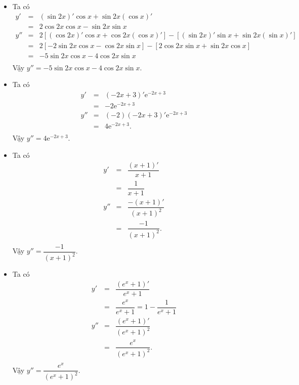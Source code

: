 \begin{bt}
{\begin{itemize}
			\item[c)]  Ta có 
			\allowdisplaybreaks
			\begin{eqnarray*}
				y'&=&\left( \sin 2 x \right)'\cos x +\sin 2 x \left( \cos x\right)' \\
				&=&2 \cos 2x \cos x- \sin 2x \sin x\\
				y''&=&2\left[\left(  \cos 2x\right) ' \cos x+\cos 2x \left( \cos x\right) '\right]- \left[\left( \sin 2x\right)'\sin x+\sin 2x  \left( \sin x\right) '\right]\\
				&=&2\left[-2\sin 2x \cos x-\cos 2x \sin x \right]- \left[2\cos 2x\sin x+\sin 2x  \cos x \right]\\
				&=&-5\sin 2x \cos x- 4\cos 2x\sin x\\
			\end{eqnarray*}
			Vậy $y''=-5\sin 2x \cos x- 4\cos 2x\sin x.$
			\item[d)]  Ta có 
			\allowdisplaybreaks
			\begin{eqnarray*}
				y'&=&(-2 x+3)'\mathrm{e}^{-2 x+3}\\
				&=&-2 \mathrm{e}^{-2 x+3}\\
				y''&=&(-2)(-2 x+3)'\mathrm{e}^{-2 x+3}\\
				&=& 4 \mathrm{e}^{-2 x+3}.\\
			\end{eqnarray*}
			Vậy $y''=4 \mathrm{e}^{-2 x+3}.$
			\item[e)] Ta có 
			\allowdisplaybreaks
			\begin{eqnarray*}
				y'&=&\dfrac{(x+1)'}{x+1}\\
				&=&\dfrac{1}{x+1}\\
				y''&=&\dfrac{-(x+1)'}{(x+1)^2}\\
				&=& \dfrac{-1}{(x+1)^2}.\\
			\end{eqnarray*}
			Vậy $y''=\dfrac{-1}{(x+1)^2}.$
			\item[f)]  Ta có 
			\allowdisplaybreaks
			\begin{eqnarray*}
				y'&=&\dfrac{\left(e^x+1\right)'}{e^x+1}\\
				&=&\dfrac{e^x}{e^x+1}=1-\dfrac{1}{e^x+1}\\
				y''&=&\dfrac{(e^x+1)'}{(e^x+1)^2}\\
				&=& \dfrac{e^x}{(e^x+1)^2}.\\
			\end{eqnarray*}
			Vậy $y''=\dfrac{e^x}{(e^x+1)^2}.$
		\end{itemize}
	}
\end{bt}

